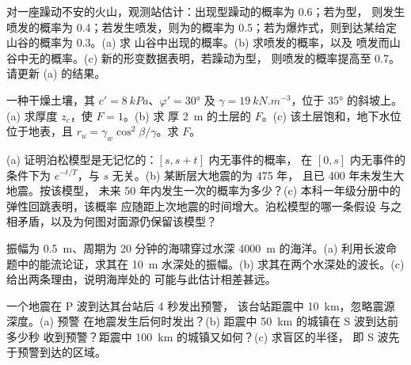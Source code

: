 \begin{exercise}[$\star\star$]\label{exo:b2:geological-hazards:8}
对一座躁动不安的火山，观测站估计：出现型躁动的概率为 0.6；若为型，
则发生喷发的概率为 0.4；若发生喷发，则为的概率为 0.5；若为爆炸式，则到达某给定山谷的概率为 0.3。(a) 求
山谷中出现的概率。(b) 求喷发的概率，以及
喷发而山谷中无的概率。(c) 新的形变数据表明，若躁动为型，
则喷发的概率提高至 0.7。请更新 (a) 的结果。
\end{exercise}

\begin{exercise}[$\star\star$]\label{exo:b2:geological-hazards:9}
一种干燥土壤，其 $c' = \qty{8}{kPa}$、$\varphi' = \ang{30}$ 及 $\gamma = \qty{19}{kN.m^{-3}}$，位于
\ang{35} 的斜坡上。(a) 求厚度 $z_c$，使 $F = 1$。(b) 求
厚 \qty{2}{m} 的土层的 $F$。(c) 该土层饱和，地下水位位于地表，且
$r_u = \gamma_w\cos^2\beta/\gamma$。求 $F$。
\end{exercise}

\begin{exercise}[$\star\star\star$]\label{exo:b2:geological-hazards:10}
(a) 证明泊松模型是无记忆的：$[s, s + t]$ 内无事件的概率，
在 $[0, s]$ 内无事件的条件下为 $e^{-t/T}$，与 $s$ 无关。(b) 某断层大地震的为 475 年，
且已 400 年未发生大地震。按该模型，
未来 50 年内发生一次的概率为多少？(c) 本科一年级分册中的弹性回跳表明，该概率
应随距上次地震的时间增大。泊松模型的哪一条假设
与之相矛盾，以及为何图对面源仍保留该模型？
\end{exercise}

\begin{exercise}[$\star\star\star$]\label{exo:b2:geological-hazards:11}
振幅为 \qty{0.5}{m}、周期为 20 分钟的海啸穿过水深 \qty{4000}{m} 的海洋。(a)
利用长波命题中的能流论证，求其在 \qty{10}{m}
水深处的振幅。(b) 求其在两个水深处的波长。(c) 给出两条理由，说明海岸处的
可能与此估计相差甚远。
\end{exercise}

\begin{exercise}[$\star\star\star$]\label{exo:b2:geological-hazards:12}
一个地震在 P 波到达其台站后 4 秒发出预警，
该台站距震中 \qty{10}{km}，忽略震源深度。(a) 预警
在地震发生后何时发出？(b) 距震中 \qty{50}{km} 的城镇在 S 波到达前多少秒
收到预警？距震中 \qty{100}{km} 的城镇又如何？(c) 求盲区的半径，
即 S 波先于预警到达的区域。
\end{exercise}

